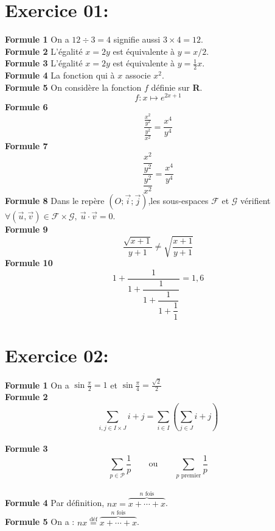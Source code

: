 \documentclass[16pt]{article}
\begin{document}
\section*{Exercice 01:}

\textbf{Formule 1}  On a $12 \div 3 = 4$ signifie aussi $3 \times 4 = 12$.\\ 
\textbf{Formule 2}  L'égalité $x = 2y$ est équivalente à $y = x/2$.\\
\textbf{Formule 3}  L'égalité $x = 2y$ est équivalente à $y = \frac{1}{2}x$.\\
\textbf{Formule 4}  La fonction qui à $x$ associe $x^2$.\\
\textbf{Formule 5}  On considère la fonction $f$ définie sur \textbf{R}. $$f : x\mapsto e^{2x+1}$$
\textbf{Formule 6}  $$\frac{\frac{x^2}{y^2}}{\frac{y^2}{x^2}} = \frac{x^4}{y^4}$$
\textbf{Formule 7}  $$\dfrac{\dfrac{x^2}{y^2}}{\dfrac{y^2}{x^2}} = \frac{x^4}{y^4}$$
\textbf{Formule 8}
Dans le repère $(O;\vec{i};\vec{j})$,les sous-espaces $\mathcal{F}$ et $\mathcal{G}$
vérifient $\forall (\vec{u},\vec{v}) \in \mathcal{F} \times \mathcal{G}, \ \vec{u}\cdot\vec{v} = 0.$\\
\textbf{Formule 9}$$\frac{\sqrt{x+1}}{y+1} \neq \sqrt{\frac{x+1}{y+1}}$$
\textbf{Formule 10} $$1 + \frac{1}{1 + \dfrac{1}{1 + \dfrac{1}{1 + \dfrac{1}{1}}}} = 1,6$$

\section*{Exercice 02:}
\textbf{Formule 1}  On a $\sin \frac{\pi}{2} = 1$ et $\sin \frac{\pi}{4} = \frac{\sqrt{2}}{2}$ \\
\textbf{Formule 2}
\[ \sum_{i,j\in I\times J} i+j = \sum_{i\in I}\left(\sum_{j\in J} i+j\right) \]
 \\
\textbf{Formule 3}
\[ \sum_{p\in\mathcal{P}}\frac{1}{p} \qquad\text{ou}\qquad
   \sum_{p\text{ premier}}\frac{1}{p} \]
 \\
\textbf{Formule 4} \quad
Par définition, \(nx=\overbrace{x+\cdots+x}^{n\text{ fois}}\).
 \\
\textbf{Formule 5} \quad
On a : \(nx \overset{\text{déf}}{=} \overbrace{x+\cdots+x}^{n\text{ fois}}\).
 
\end{document}
